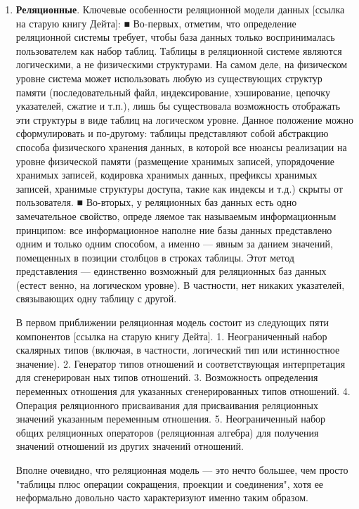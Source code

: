 \begin{enumerate}[label*=\arabic*.]
\begin{enumerate}[label*=\arabic*.]
	\end{enumerate}
	
	\item \textbf{Реляционные}. \newline
	Ключевые особенности реляционной модели данных [ссылка на старую книгу Дейта]:
	■ Во-первых, отметим, что определение реляционной системы требует, чтобы база
	данных только воспринималась пользователем как набор таблиц. Таблицы в реляционной системе являются логическими, а не физическими структурами. На самом
	деле, на физическом уровне система может использовать любую из существующих
	структур памяти (последовательный файл, индексирование, хэширование, цепочку указателей, сжатие и т.п.), лишь бы существовала возможность отображать
	эти структуры в виде таблиц на логическом уровне. Данное положение можно
	сформулировать и по-другому: таблицы представляют собой абстракцию способа
	физического хранения данных, в которой все нюансы реализации на уровне физической памяти (размещение хранимых записей, упорядочение хранимых записей,
	кодировка хранимых данных, префиксы хранимых записей, хранимые структуры
	доступа, такие как индексы и т.д.) скрыты от пользователя.
	■ Во-вторых, у реляционных баз данных есть одно замечательное свойство, опреде
	ляемое так называемым информационным принципом: все информационное наполне
	ние базы данных представлено одним и только одним способом, а именно — явным за
	данием значений, помещенных в позиции столбцов в строках таблицы. Этот метод
	представления — единственно возможный для реляционных баз данных (естест
	венно, на логическом уровне). В частности, нет никаких указателей, связывающих
	одну таблицу с другой.
	
	В первом приближении
	реляционная модель состоит из следующих пяти компонентов [ссылка на старую книгу Дейта].
	1. Неограниченный набор скалярных типов (включая, в частности, логический тип
	или истинностное значение).
	2. Генератор типов отношений и соответствующая интерпретация для сгенерирован
	ных типов отношений.
	3. Возможность определения переменных отношения для указанных сгенерированных
	типов отношений.
	4. Операция реляционного присваивания для присваивания реляционных значений
	указанным переменным отношения.
	5. Неограниченный набор общих реляционных операторов (реляционная алгебра) для
		получения значений отношений из других значений отношений.
	
	Вполне очевидно, что реляционная модель — это нечто большее, чем просто "таблицы плюс операции сокращения, проекции и соединения", хотя ее неформально довольно
	часто характеризуют именно таким образом. 
	

\end{enumerate}
